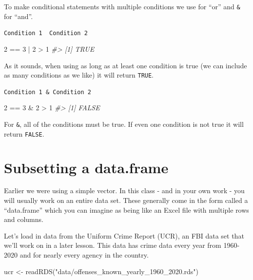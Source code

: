 \documentclass[
]{krantz}
\makeatletter
\newenvironment{Shaded}{\begin{snugshade}}{\end{snugshade}}
\newcommand{\CommentTok}[1]{\textcolor[rgb]{0.37,0.37,0.37}{\textit{#1}}}
\newcommand{\DecValTok}[1]{\textcolor[rgb]{0.06,0.06,0.06}{#1}}
\newcommand{\FunctionTok}[1]{\textcolor[rgb]{0,0,0}{#1}}
\newcommand{\NormalTok}[1]{#1}
\newcommand{\OtherTok}[1]{\textcolor[rgb]{0.37,0.37,0.37}{#1}}
\newcommand{\SpecialCharTok}[1]{\textcolor[rgb]{0,0,0}{#1}}
\newcommand{\StringTok}[1]{\textcolor[rgb]{0.5,0.5,0.5}{#1}}
\newenvironment{kframe}{%
\medskip{}
\setlength{\fboxsep}{.8em}
 \def\at@end@of@kframe{}%
 \ifinner\ifhmode%
  \def\at@end@of@kframe{\end{minipage}}%
  \begin{minipage}{\columnwidth}%
 \fi\fi%
 \def\FrameCommand##1{\hskip\@totalleftmargin \hskip-\fboxsep
 \colorbox{shadecolor}{##1}\hskip-\fboxsep
     \hskip-\linewidth \hskip-\@totalleftmargin \hskip\columnwidth}%
 \MakeFramed {\advance\hsize-\width
   \@totalleftmargin\z@ \linewidth\hsize
   \@setminipage}}%
 {\par\unskip\endMakeFramed%
 \at@end@of@kframe}
\renewenvironment{Shaded}{\begin{kframe}}{\end{kframe}}
\makeatother
\begin{document}
To make conditional statements with multiple conditions we use \texttt{\textbar{}} for ``or'' and \texttt{\&} for ``and''.

\texttt{Condition\ 1\ \textbar{}\ Condition\ 2}

\begin{Shaded}
\begin{Highlighting}[]
\DecValTok{2} \SpecialCharTok{==} \DecValTok{3} \SpecialCharTok{|} \DecValTok{2} \SpecialCharTok{\textgreater{}} \DecValTok{1}
\CommentTok{\#\textgreater{} [1] TRUE}
\end{Highlighting}
\end{Shaded}

As it sounds, when using \texttt{\textbar{}} as long as at least one condition is true (we can include as many conditions as we like) it will return \texttt{TRUE}.

\texttt{Condition\ 1\ \&\ Condition\ 2}

\begin{Shaded}
\begin{Highlighting}[]
\DecValTok{2} \SpecialCharTok{==} \DecValTok{3} \SpecialCharTok{\&} \DecValTok{2} \SpecialCharTok{\textgreater{}} \DecValTok{1}
\CommentTok{\#\textgreater{} [1] FALSE}
\end{Highlighting}
\end{Shaded}

For \texttt{\&}, all of the conditions must be true. If even one condition is not true it will return \texttt{FALSE}.

\hypertarget{subsetting-a-data.frame}{%
\section{Subsetting a data.frame}\label{subsetting-a-data.frame}}

Earlier we were using a simple vector. In this class - and in your own work - you will usually work on an entire data set. These generally come in the form called a ``data.frame'' which you can imagine as being like an Excel file with multiple rows and columns.

Let's load in data from the Uniform Crime Report (UCR), an FBI data set that we'll work on in a later lesson. This data has crime data every year from 1960-2020 and for nearly every agency in the country.

\begin{Shaded}
\begin{Highlighting}[]
\NormalTok{ucr }\OtherTok{\textless{}{-}} \FunctionTok{readRDS}\NormalTok{(}\StringTok{"data/offenses\_known\_yearly\_1960\_2020.rds"}\NormalTok{)}
\end{Highlighting}
\end{Shaded}
\end{document}
